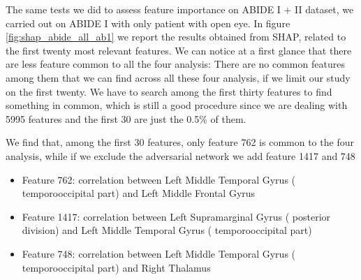 \documentclass[11pt]{report}
\begin{document}
The same tests we did to assess feature importance on ABIDE I + II dataset, we carried out on ABIDE I with only patient with open eye.
In figure \ref{fig:shap_abide_all_ab1} we report the results obtained from SHAP, related to the first twenty most relevant features.
We can notice at a first glance that there are less feature common to all the four analysis:
There are no common features among them that we can find across all these four analysis, if we limit our study on the first twenty.
We have to search among the first thirty features to find something in common, which is still a good procedure since we are dealing with 5995 features and the first 30 are just the 0.5\% of them.

We find that, among the first 30 features, only feature  762 is common to the four analysis, while if we exclude the adversarial network we add feature 1417 and 748




\begin{itemize}
\item Feature 762: correlation between Left Middle Temporal Gyrus ( temporooccipital part) and Left Middle Frontal Gyrus
\item Feature 1417: correlation between Left Supramarginal Gyrus ( posterior division) and Left Middle Temporal Gyrus ( temporooccipital part)
\item Feature 748: correlation between Left Middle Temporal Gyrus ( temporooccipital part) and Right Thalamus
\end{itemize}
\end{document}
